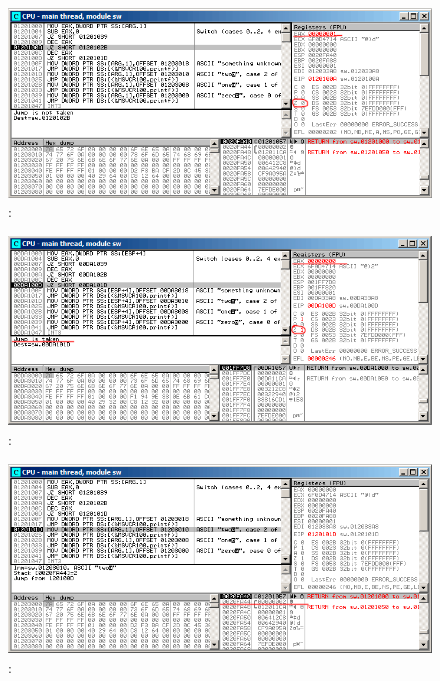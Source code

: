 \begin{figure}[H]
\centering
\includegraphics[scale=\FigScale]{patterns/08_switch/1_few/few_olly3.png}
\caption{\olly:  \DEC {}}
\label{fig:switch_few_olly3}
\end{figure}

\begin{figure}[H]
\centering
\includegraphics[scale=\FigScale]{patterns/08_switch/1_few/few_olly4.png}
\caption{\olly:  \DEC {}}
\label{fig:switch_few_olly4}
\end{figure}

\begin{figure}[H]
\centering
\includegraphics[scale=\FigScale]{patterns/08_switch/1_few/few_olly5.png}
\caption{\olly: 
}
\label{fig:switch_few_olly5}
\end{figure}

